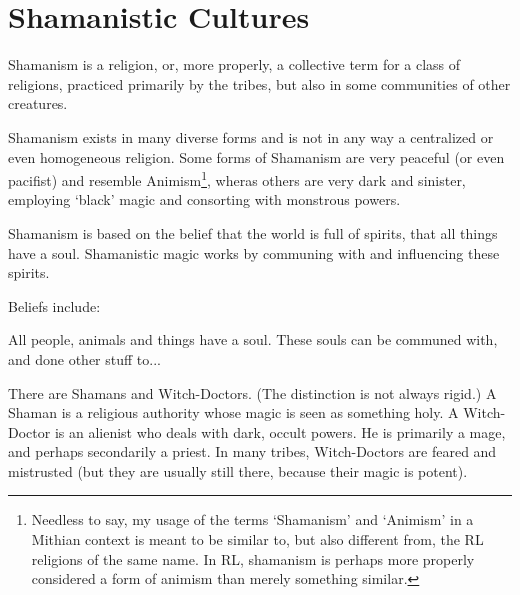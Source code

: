 \section{Shamanistic Cultures}
\label{Shamanism}
Shamanism is a religion, or, more properly, a collective term for a class of religions, practiced primarily by the \meccaran{} tribes, but also in some communities of other creatures. %

Shamanism exists in many diverse forms and is not in any way a centralized or even homogeneous religion. Some forms of Shamanism are very peaceful (or even pacifist) and resemble Animism\footnote{Needless to say, my usage of the terms `Shamanism' and `Animism' in a Mithian context is meant to be similar to, but also different from, the RL religions of the same name. In RL, shamanism is perhaps more properly considered a form of animism than merely something similar.}, wheras others are very dark and sinister, employing `black' magic and consorting with monstrous powers. 

Shamanism is based on the belief that the world is full of spirits, that all things have a soul. Shamanistic magic works by communing with and influencing these spirits. 

Beliefs include: 

All people, animals and things have a soul. These souls can be communed with, and done other stuff to... 



There are Shamans and Witch-Doctors. (The distinction is not always rigid.) A Shaman is a religious authority whose magic is seen as something holy. A Witch-Doctor is an alienist who deals with dark, occult powers. He is primarily a mage, and perhaps secondarily a priest. In many tribes, Witch-Doctors are feared and mistrusted (but they are usually still there, because their magic is potent). 

